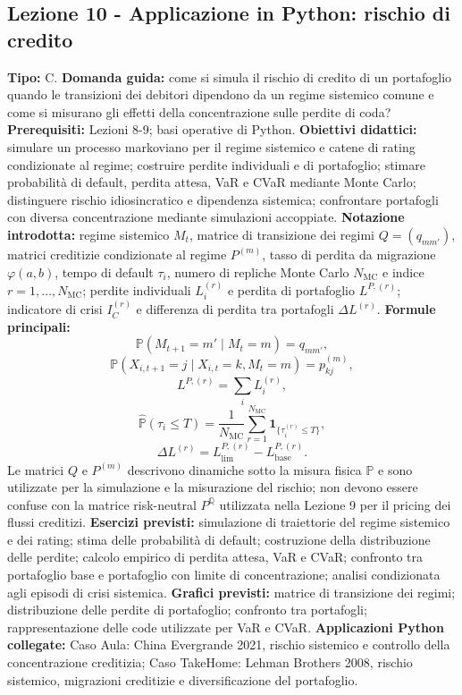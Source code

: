\documentclass[12pt,a4paper]{article}%
\newcommand{\Prob}{\mathbb{P}}
\newcommand{\Q}{\mathbb{Q}}
\newcommand{\1}{\mathbf{1}}
\begin{document}
\subsection{Lezione 10 - Applicazione in Python: rischio di credito}

\textbf{Tipo:} C.\newline
\textbf{Domanda guida:} come si simula il rischio di credito di un portafoglio
quando le transizioni dei debitori dipendono da un regime sistemico comune e
come si misurano gli effetti della concentrazione sulle perdite di coda?\newline
\textbf{Prerequisiti:} Lezioni 8-9; basi operative di Python.\newline
\textbf{Obiettivi didattici:} simulare un processo markoviano per il regime
sistemico e catene di rating condizionate al regime; costruire perdite
individuali e di portafoglio; stimare probabilit\`{a} di default, perdita
attesa, VaR e CVaR mediante Monte Carlo; distinguere rischio idiosincratico e
dipendenza sistemica; confrontare portafogli con diversa concentrazione
mediante simulazioni accoppiate.\newline
\textbf{Notazione introdotta:} regime sistemico $M_t$, matrice di transizione
dei regimi $Q=(q_{mm'})$, matrici creditizie condizionate al regime
$P^{(m)}$, tasso di perdita da migrazione $\varphi(a,b)$, tempo di default
$\tau_i$, numero di repliche Monte Carlo
$N_{\mathrm{MC}}$ e indice $r=1,\ldots,N_{\mathrm{MC}}$; perdite individuali
$L_i^{(r)}$ e perdita di portafoglio $L^{P,(r)}$; indicatore di crisi
$I_C^{(r)}$ e differenza di perdita tra portafogli $\Delta L^{(r)}$.\newline
\textbf{Formule principali:}
\[
\Prob(M_{t+1}=m'\mid M_t=m)=q_{mm'},
\]
\[
\Prob(X_{i,t+1}=j\mid X_{i,t}=k,M_t=m)=p_{kj}^{(m)},
\]
\[
L^{P,(r)}
=
\sum_i L_i^{(r)},
\]
\[
\widehat{\Prob}(\tau_i\leq T)
=
\frac{1}{N_{\mathrm{MC}}}
\sum_{r=1}^{N_{\mathrm{MC}}}
\1_{\{\tau_i^{(r)}\leq T\}},
\]
\[
\Delta L^{(r)}
=
L_{\mathrm{lim}}^{P,(r)}
-
L_{\mathrm{base}}^{P,(r)}.
\]
Le matrici $Q$ e $P^{(m)}$ descrivono dinamiche sotto la misura fisica
$\Prob$ e sono utilizzate per la simulazione e la misurazione del rischio;
non devono essere confuse con la matrice risk-neutral $P^{\Q}$ utilizzata
nella Lezione 9 per il pricing dei flussi creditizi.\newline
\textbf{Esercizi previsti:} simulazione di traiettorie del regime sistemico e
dei rating; stima delle probabilit\`{a} di default; costruzione della
distribuzione delle perdite; calcolo empirico di perdita attesa, VaR e CVaR;
confronto tra portafoglio base e portafoglio con limite di concentrazione;
analisi condizionata agli episodi di crisi sistemica.\newline
\textbf{Grafici previsti:} matrice di transizione dei regimi; distribuzione
delle perdite di portafoglio; confronto tra portafogli; rappresentazione delle
code utilizzate per VaR e CVaR.\newline
\textbf{Applicazioni Python collegate:} Caso Aula: China Evergrande 2021,
rischio sistemico e controllo della concentrazione creditizia; Caso TakeHome:
Lehman Brothers 2008, rischio sistemico, migrazioni creditizie e
diversificazione del portafoglio.
\end{document}
